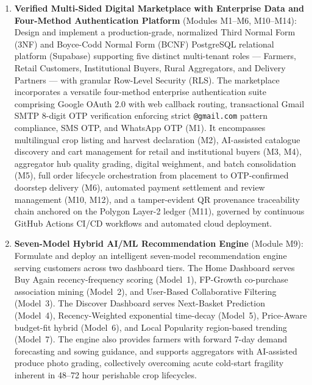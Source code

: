 \begin{enumerate}[label=\textbf{Objective \arabic*:}, leftmargin=2.5cm]
	\item \textbf{Verified Multi-Sided Digital Marketplace with Enterprise Data and Four-Method Authentication Platform} (Modules M1--M6, M10--M14): Design and implement a production-grade, normalized Third Normal Form (3NF) and Boyce-Codd Normal Form (BCNF) PostgreSQL relational platform (Supabase) supporting five distinct multi-tenant roles --- Farmers, Retail Customers, Institutional Buyers, Rural Aggregators, and Delivery Partners --- with granular Row-Level Security (RLS). The marketplace incorporates a versatile four-method enterprise authentication suite comprising Google OAuth 2.0 with web callback routing, transactional Gmail SMTP 8-digit OTP verification enforcing strict \texttt{@gmail.com} pattern compliance, SMS OTP, and WhatsApp OTP (M1). It encompasses multilingual crop listing and harvest declaration (M2), AI-assisted catalogue discovery and cart management for retail and institutional buyers (M3, M4), aggregator hub quality grading, digital weighment, and batch consolidation (M5), full order lifecycle orchestration from placement to OTP-confirmed doorstep delivery (M6), automated payment settlement and review management (M10, M12), and a tamper-evident QR provenance traceability chain anchored on the Polygon Layer-2 ledger (M11), governed by continuous GitHub Actions CI/CD workflows and automated cloud deployment.

	\item \textbf{Seven-Model Hybrid AI/ML Recommendation Engine} (Module M9): Formulate and deploy an intelligent seven-model recommendation engine serving customers across two dashboard tiers. The Home Dashboard serves Buy Again recency-frequency scoring (Model~1), FP-Growth co-purchase association mining (Model~2), and User-Based Collaborative Filtering (Model~3). The Discover Dashboard serves Next-Basket Prediction (Model~4), Recency-Weighted exponential time-decay (Model~5), Price-Aware budget-fit hybrid (Model~6), and Local Popularity region-based trending (Model~7). The engine also provides farmers with forward 7-day demand forecasting and sowing guidance, and supports aggregators with AI-assisted produce photo grading, collectively overcoming acute cold-start fragility inherent in 48--72 hour perishable crop lifecycles.


\end{enumerate}
